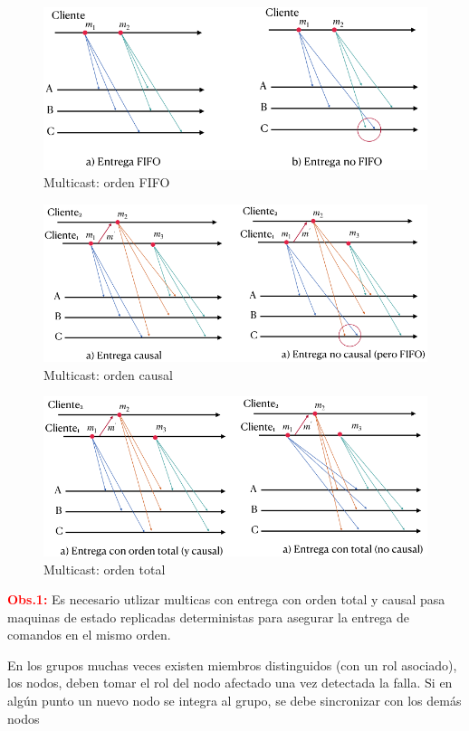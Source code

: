 \begin{figure}[H]
    \centering
    \includegraphics[width=0.7\linewidth]{img/multi_fifo.png}
    \caption{Multicast: orden FIFO}\label{fig:1761678535409}
\end{figure}

\begin{figure}[H]
    \centering
    \includegraphics[width=0.7\linewidth]{img/multi_causal.png}
    \caption{Multicast: orden causal}\label{fig:1761678585653}
\end{figure}

\begin{figure}[H]
    \centering
    \includegraphics[width=0.7\linewidth]{img/multi_total.png}
    \caption{Multicast: orden total}\label{fig:1761678629682}
\end{figure}

\textcolor{red}{\textbf{Obs.1:}} Es necesario utlizar multicas con entrega con orden total y causal pasa maquinas de estado replicadas deterministas para asegurar la entrega de comandos en el mismo orden.

En los grupos muchas veces existen miembros distinguidos (con un rol asociado), los nodos, deben tomar el rol del nodo afectado una vez detectada la falla. Si en algún punto un nuevo nodo se integra al grupo, se debe sincronizar con los demás nodos
